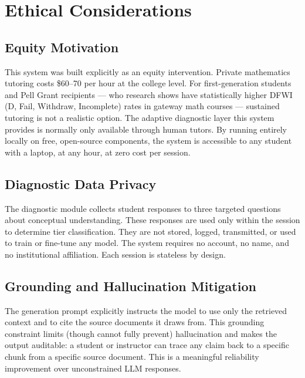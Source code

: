\documentclass[11pt]{article}
\begin{document}
\section{Ethical Considerations}

\subsection{Equity Motivation}

This system was built explicitly as an equity intervention. Private mathematics tutoring costs \$60--70 per hour at the college level. For first-generation students and Pell Grant recipients --- who research shows have statistically higher DFWI (D, Fail, Withdraw, Incomplete) rates in gateway math courses --- sustained tutoring is not a realistic option. The adaptive diagnostic layer this system provides is normally only available through human tutors. By running entirely locally on free, open-source components, the system is accessible to any student with a laptop, at any hour, at zero cost per session.

\subsection{Diagnostic Data Privacy}

The diagnostic module collects student responses to three targeted questions about conceptual understanding. These responses are used only within the session to determine tier classification. They are not stored, logged, transmitted, or used to train or fine-tune any model. The system requires no account, no name, and no institutional affiliation. Each session is stateless by design.

\subsection{Grounding and Hallucination Mitigation}

The generation prompt explicitly instructs the model to use only the retrieved context and to cite the source documents it draws from. This grounding constraint limits (though cannot fully prevent) hallucination and makes the output auditable: a student or instructor can trace any claim back to a specific chunk from a specific source document. This is a meaningful reliability improvement over unconstrained LLM responses.
\end{document}

